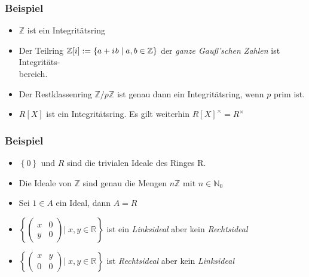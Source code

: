 \documentclass[12pt]{article}
\begin{document}
\subsubsection*{Beispiel}
\begin{itemize}
	\item  $ \mathbb{Z}  $ ist ein Integritätsring
	\item Der Teilring $ \mathbb{Z}[i] := \left\{ a + {i\mkern1mu} b \; | \; a, b \in  \mathbb{Z}\right\} $ 
		der \textit{ganze Gauß'schen Zahlen} ist Integritäts-\\bereich.
	\item Der Restklassenring $ \mathbb{Z} / p \mathbb{Z}  $ ist genau dann ein Integritätsring, wenn 
		$ p $ prim ist.
	\item $ R[X] $ ist ein Integritätsring. Es gilt weiterhin $ R[X]^{\times} = R^{\times} $ 
\end{itemize}


\subsubsection*{Beispiel}
\begin{itemize}
	\item $ \left\{ 0 \right\} \text{ und } R $ sind die trivialen Ideale des Ringes R.
	\item Die Ideale von $ \mathbb{Z}  $ sind genau die Mengen $ n \mathbb{Z}  \text{ mit } n \in \mathbb{N}_{0}$ 
	\item Sei $ 1 \in A $ ein Ideal, dann $ A = R $ 
	\item $ \left\{ \begin{pmatrix}x &0 \\ y &0 \end{pmatrix} | \; x, y \in \mathbb{R} \right\}  $ ist ein 
		\textit{Linksideal} aber kein \textit{Rechtsideal} 
	\item $ \left\{ \begin{pmatrix}x &y \\ 0 &0 \end{pmatrix} | \; x, y \in \mathbb{R} \right\}  $ ist 
		\textit{Rechtsideal} aber kein \textit{Linksideal} 
\end{itemize}
\end{document}
